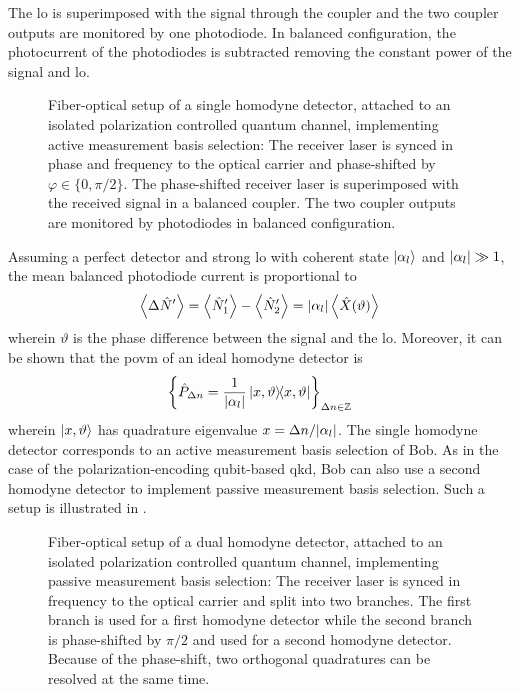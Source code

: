 The \gls{lo} is superimposed with the signal through the coupler and the two coupler outputs are monitored by one photodiode.
In balanced configuration, the photocurrent of the photodiodes is subtracted removing the constant power of the signal and \gls{lo}.
\begin{figure}[htb]
	\centering
	
	\caption{Fiber-optical setup of a single homodyne detector, attached to an isolated polarization controlled quantum channel, implementing active measurement basis selection: The receiver laser is synced in phase and frequency to the optical carrier and phase-shifted by $\varphi\in\{0,\pi/2\}$. The phase-shifted receiver laser is superimposed with the received signal in a balanced coupler. The two coupler outputs are monitored by photodiodes in balanced configuration.}\label{fig:coherent_receiver_active}
\end{figure}
Assuming a perfect detector and strong \gls{lo} with coherent state $\ket{\alpha_l}$ and $\abs{\alpha_l}\gg1$, the mean balanced photodiode current is proportional to~\cite[p.~217]{Vogel2006}
\begin{equation}
	\expval{\Delta\hat{N}^\prime}
	=
	\expval{\hat{N}_1^\prime}
	-
	\expval{\hat{N}_2^\prime}
	=
	\abs{\alpha_l}
	\expval{\hat{X}(\vartheta)}
\end{equation}
wherein $\vartheta$ is the phase difference between the signal and the \gls{lo}.
Moreover, it can be shown that the \gls{povm} of an ideal homodyne detector is~\cite[p.~220]{Vogel2006}
\begin{equation}
	\left\{\hat{P}_{\Delta n}=\frac{1}{\abs{\alpha_l}}\ketbra{x,\vartheta}\right\}_{\Delta n\in\mathbb{Z}}
\end{equation}
wherein $\ket{x,\vartheta}$ has quadrature eigenvalue $x=\Delta n/\abs{\alpha_l}$.
The single homodyne detector corresponds to an active measurement basis selection of Bob.
As in the case of the polarization-encoding qubit-based \gls{qkd}, Bob can also use a second homodyne detector to implement passive measurement basis selection.
Such a setup is illustrated in .
\begin{figure}[htb]
	\centering
	
	\caption{Fiber-optical setup of a dual homodyne detector, attached to an isolated polarization controlled quantum channel, implementing passive measurement basis selection: The receiver laser is synced in frequency to the optical carrier and split into two branches. The first branch is used for a first homodyne detector while the second branch is phase-shifted by $\pi/2$ and used for a second homodyne detector. Because of the phase-shift, two orthogonal quadratures can be resolved at the same time.}\label{fig:coherent_receiver_passive}
\end{figure}
